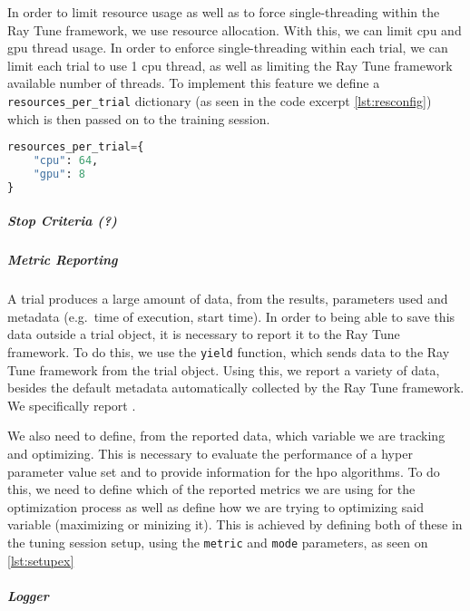 In order to limit resource usage as well as to force single-threading within the Ray Tune framework, we use resource allocation. With this, we can limit \acrshort{cpu} and \acrshort{gpu} thread usage. In order to enforce single-threading within each trial, we can limit each trial to use 1 \acrshort{cpu} thread, as well as limiting the Ray Tune framework available number of threads. To implement this feature we define a \verb!resources_per_trial! dictionary (as seen in the code excerpt \ref{lst:resconfig}) which is then passed on to the training session.


\begin{lstlisting}[language=Python, caption=Example resource allocation configuration, captionpos=b, label={lst:resconfig}]
resources_per_trial={
    "cpu": 64, 
    "gpu": 8
}
\end{lstlisting}

\subparagraph{Stop Criteria (?)}



\subparagraph{Metric Reporting}

A trial produces a large amount of data, from the results, parameters used and metadata (e.g.\ time of execution, start time). In order to being able to save this data outside a trial object, it is necessary to report it to the Ray Tune framework. To do this, we use the \verb!yield! function, which sends data to the Ray Tune framework from the trial object. Using this, we report a variety of data, besides the default metadata automatically collected by the Ray Tune framework. We specifically report .

We also need to define, from the reported data, which variable we are tracking and optimizing. This is necessary to evaluate the performance of a hyper parameter value set and to provide information for the \acrshort{hpo} algorithms. To do this, we need to define which of the reported metrics we are using for the optimization process as well as define how we are trying to optimizing said variable (maximizing or minizing it). This is achieved by defining both of these in the tuning session setup, using the \verb!metric! and \verb!mode! parameters, as seen on \ref{lst:setupex}

\subparagraph{Logger}

